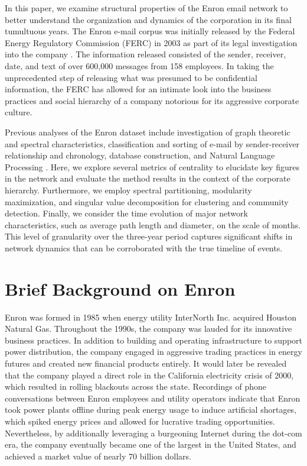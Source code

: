 \documentclass[12pt]{article}
\begin{document}
	In this paper, we examine structural properties of the Enron email network to better understand the organization and dynamics of the corporation in its final tumultuous years. The Enron e-mail corpus was initially released by the Federal Energy Regulatory Commission (FERC) in 2003 as part of its legal investigation into the company \cite{ferc}. The information released consisted of the sender, receiver, date, and text of over 600,000 messages from 158 employees. In taking the unprecedented step of releasing what was presumed to be confidential information, the FERC has allowed for an intimate look into the business practices and social hierarchy of a company notorious for its aggressive corporate culture.
	
Previous analyses of the Enron dataset include investigation of graph theoretic and spectral characteristics, classification and sorting of e-mail by sender-receiver relationship and chronology, database construction, and Natural Language Processing \cite{Diesner, Chapanond, Priebe}. Here, we explore several metrics of centrality to elucidate key figures in the network and evaluate the method results in the context of the corporate hierarchy. Furthermore, we employ spectral partitioning, modularity maximization, and singular value decomposition for clustering and community detection. Finally, we consider the time evolution of major network characteristics, such as average path length and diameter, on the scale of months. This level of granularity over the three-year period captures significant shifts in network dynamics that can be corroborated with the true timeline of events. 

\section{Brief Background on Enron}
Enron was formed in 1985 when energy utility InterNorth Inc. acquired Houston Natural Gas. Throughout the 1990s, the company was lauded for its innovative business practices. In addition to building and operating infrastructure to support power distribution, the company engaged in aggressive trading practices in energy futures and created new financial products entirely. It would later be revealed that the company played a direct role in the California electricity crisis of 2000, which resulted in rolling blackouts across the state. Recordings of phone conversations between Enron employees and utility operators indicate that Enron took power plants offline during peak energy usage to induce artificial shortages, which spiked energy prices and allowed for lucrative trading opportunities. Nevertheless, by additionally leveraging a burgeoning Internet during the dot-com era, the company eventually became one of the largest in the United States, and achieved a market value of nearly 70 billion dollars.
\end{document}
